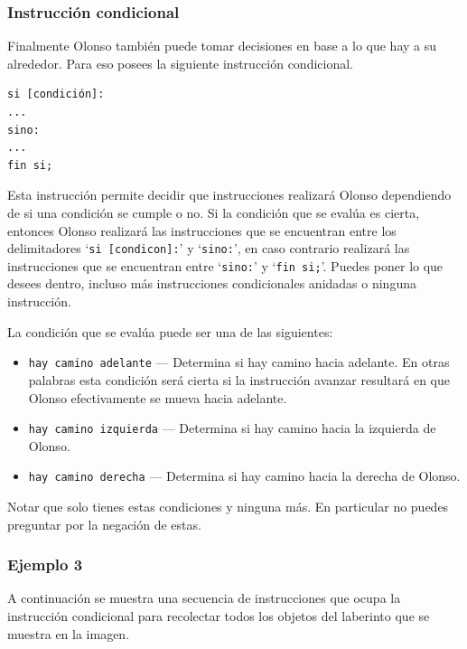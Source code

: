 \documentclass{oci}
\begin{document}
\begin{problemDescription}
\subsubsection*{Instrucción condicional}
Finalmente Olonso también puede tomar decisiones en base a lo que hay a su alrededor.
Para eso posees la siguiente instrucción condicional.

\begin{verbatim}
si [condición]:
...
sino:
...
fin si;
\end{verbatim}
  
Esta instrucción permite decidir que instrucciones realizará Olonso dependiendo de si una condición se cumple o no.
Si la condición que se evalúa es cierta, entonces Olonso realizará las instrucciones que se encuentran entre los delimitadores `\texttt{si [condicon]:}' y `\texttt{sino:}', en caso contrario realizará las instrucciones que se encuentran entre `\texttt{sino:}' y `\texttt{fin si;}'.
Puedes poner lo que desees dentro, incluso más instrucciones condicionales anidadas o ninguna instrucción.

La condición que se evalúa puede ser una de las siguientes:

\begin{itemize}
\item \texttt{hay camino adelante} --- Determina si hay camino hacia adelante.
En otras palabras esta condición será cierta si la instrucción avanzar resultará en que Olonso efectivamente se mueva hacia adelante.
\item \texttt{hay camino izquierda} --- Determina si hay camino hacia la izquierda de Olonso. 
\item \texttt{hay camino derecha} --- Determina si hay camino hacia la derecha de Olonso. 
\end{itemize}

Notar que solo tienes estas condiciones y ninguna más.
En particular no puedes preguntar por la negación de estas.

\subsubsection*{Ejemplo 3}
A continuación se muestra una secuencia de instrucciones que ocupa la instrucción condicional para recolectar todos los objetos del laberinto que se muestra en la imagen.


\end{problemDescription}
\end{document}

